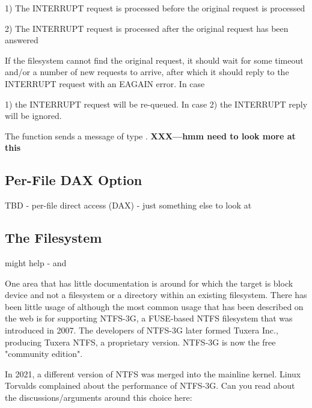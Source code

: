 1) The INTERRUPT request is processed before the original request is processed

2) The INTERRUPT request is processed after the original request has been answered

If the filesystem cannot find the original request, it should wait for some timeout and/or a number of new requests to arrive, after which it should reply to the INTERRUPT request with an EAGAIN error.  In case

1) the INTERRUPT request will be re-queued.  In case 2) the INTERRUPT reply will be ignored.

The  function sends a message of type . \textbf{XXX---hmm need to look more at this}


\subsection{Per-File DAX Option}


TBD - per-file direct access (DAX) - just something else to look at


\subsection{The  Filesystem}

might help - %
and %

One area that has little documentation is around  for which the target is block device and not a filesystem or a directory within an existing filesystem. There has been little usage of although the most common usage that has been described on the web is for supporting NTFS-3G, a FUSE-based NTFS filesystem that was introduced in 2007. The developers of NTFS-3G later formed Tuxera Inc., producing Tuxera NTFS, a proprietary version. NTFS-3G is now the free "community edition".

In 2021, a different version of NTFS was merged into the mainline kernel. Linux Torvalds complained about the performance of NTFS-3G. Can you read about the discussions/arguments around this choice here:


